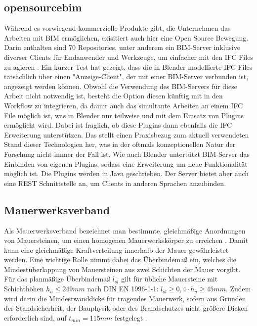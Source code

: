 \subsection{opensourcebim}
Während es vorwiegend kommerzielle Produkte gibt, die Unternehmen das Arbeiten mit BIM ermöglichen, exisitiert auch hier eine Open Source Bewegung.
Darin enthalten sind 70 Repositories, unter anderem ein BIM-Server inklusive diverser Clients für Endanwender und Werkzeuge, um einfacher mit den IFC Files zu agieren \cite{Theopens96:online}.
Ein kurzer Test hat gezeigt, dass die in Blender modellierte IFC Files tatsächlich über einen "Anzeige-Client", der mit einer BIM-Server verbunden ist, angezeigt werden können.
Obwohl die Verwendung des BIM-Servers für diese Arbeit nicht notwendig ist, besteht die Option diesen künftig mit in den Workflow zu integrieren, da damit auch das simultante Arbeiten an einem IFC File möglich ist, was in Blender nur teilweise und mit dem Einsatz von Plugins ermöglicht wird.
Dabei ist fraglich, ob diese Plugins dann ebenfalls die IFC Erweiterung unterstützen.
Das stellt einen Praxisbezug zum aktuell verwendeten Stand dieser Technologien her, was in der oftmals konzeptionellen Natur der Forschung nicht immer der Fall ist.
Wie auch Blender untertützt BIM-Server das Einbinden von eigenen Plugins, sodass eine Erweiterung um neue Funktionalität möglich ist.
Die Plugins werden in Java geschrieben.
Der Server bietet aber auch eine REST Schnittstelle an, um Clients in anderen Sprachen anzubinden.

\subsection{Mauerwerksverband}
Als Mauerwerksverband bezeichnet man bestimmte, gleichmäßige Anordnungen von Mauersteinen, um einen homogenen Mauerwerkskörper zu erreichen \cite{Mauerwer39:online}.
Damit kann eine gleichmäßige Kraftverteilung innerhalb der Mauer gewährleistet werden.
Eine wichtige Rolle nimmt dabei das Überbindemaß ein, welches die Mindestüberlappung von Mauersteinen aus zwei Schichten der Mauer vorgibt.
Für das planmäßige Überbindemaß \(l_{ ol }\) gilt für übliche Mauersteine mit Schichthöhen \(h_{ u } \leq 249 mm\) nach DIN EN 1996-1-1: \( l_{ ol } \geq 0,4 · h_{ u } \geq 45 mm\)\cite{Bemessun72:online}\cite{DIN_EN_1996_1_1}.
Zudem wird darin die Mindestwanddicke für tragendes Mauerwerk, sofern aus Gründen der Standsicherheit, der Bauphysik oder des Brandschutzes nicht größere Dicken erforderlich sind, auf  \(t_{ min } = 115 mm\) festgelegt \cite{Bemessun72:online}\cite{DIN_EN_1996_1_1}.

